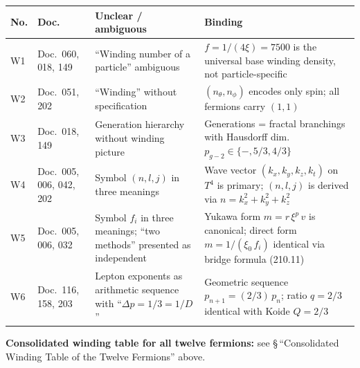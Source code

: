 \begin{center}
\renewcommand{\arraystretch}{1.3}
{\footnotesize
\begin{tabular}{>{\raggedright\arraybackslash}p{0.7cm}>{\raggedright\arraybackslash}p{2.7cm}>{\raggedright\arraybackslash}p{5.0cm}>{\raggedright\arraybackslash}p{5.6cm}}
\toprule
\textbf{No.} & \textbf{Doc.} & \textbf{Unclear / ambiguous} & \textbf{Binding} \\
\midrule
W1 & Doc.~060, 018, 149 &
  \enquote{Winding number of a particle} ambiguous &
  $f = 1/(4\xi) = 7500$ is the universal base winding density, not particle-specific \\
W2 & Doc.~051, 202 &
  \enquote{Winding} without specification &
  $(n_\theta, n_\phi)$ encodes only spin; all fermions carry $(1,1)$ \\
W3 & Doc.~018, 149 &
  Generation hierarchy without winding picture &
  Generations = fractal branchings with Hausdorff dim.\ $p_{g\!-\!2} \in \{-, 5/3, 4/3\}$ \\
W4 & Doc.~005, 006, 042, 202 &
  Symbol $(n,l,j)$ in three meanings &
  Wave vector $(k_x,k_y,k_z,k_t)$ on $T^4$ is primary; $(n,l,j)$ is derived via $n = k_x^2+k_y^2+k_z^2$ \\
W5 & Doc.~005, 006, 032 &
  Symbol $f_i$ in three meanings; \enquote{two methods} presented as independent &
  Yukawa form $m=r\,\xi^p\,v$ is canonical; direct form $m = 1/(\xi_0\,f_i)$ identical via bridge formula (210.11) \\
W6 & Doc.~116, 158, 203 &
  Lepton exponents as arithmetic sequence with \enquote{$\Delta p = 1/3 = 1/D$} &
  Geometric sequence $p_{n+1} = (2/3)\,p_n$; ratio $q = 2/3$ identical with Koide $Q = 2/3$ \\
\bottomrule
\end{tabular}
}
\renewcommand{\arraystretch}{1.0}
\end{center}

\textbf{Consolidated winding table for all twelve fermions:} see
\S\,\enquote{Consolidated Winding Table of the Twelve Fermions} above.
